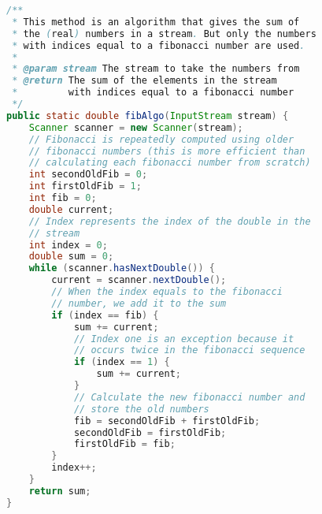 \documentclass[12pt]{article}
\begin{document}
\begin{lstlisting}[language=java]
/**
 * This method is an algorithm that gives the sum of
 * the (real) numbers in a stream. But only the numbers 
 * with indices equal to a fibonacci number are used.
 *
 * @param stream The stream to take the numbers from
 * @return The sum of the elements in the stream 
 *         with indices equal to a fibonacci number
 */
public static double fibAlgo(InputStream stream) {
    Scanner scanner = new Scanner(stream);
    // Fibonacci is repeatedly computed using older
    // fibonacci numbers (this is more efficient than 
    // calculating each fibonacci number from scratch)
    int secondOldFib = 0;
    int firstOldFib = 1;
    int fib = 0;
    double current;
    // Index represents the index of the double in the
    // stream
    int index = 0;
    double sum = 0;
    while (scanner.hasNextDouble()) {
        current = scanner.nextDouble();
        // When the index equals to the fibonacci 
        // number, we add it to the sum
        if (index == fib) {
            sum += current;
            // Index one is an exception because it
            // occurs twice in the fibonacci sequence
            if (index == 1) {
                sum += current;
            }
            // Calculate the new fibonacci number and
            // store the old numbers
            fib = secondOldFib + firstOldFib;
            secondOldFib = firstOldFib;
            firstOldFib = fib;
        }
        index++;
    }
    return sum;
}
\end{lstlisting}
\end{document}
